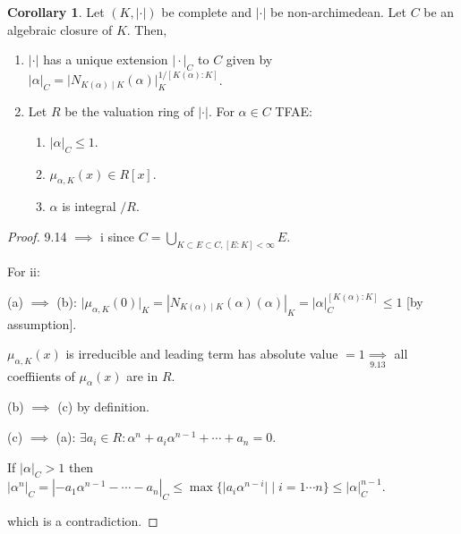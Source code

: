 \documentclass[openany]{amsbook}
\numberwithin{section}{chapter}
\theoremstyle{definition}
\newtheorem{corollary}[theorem]{Corollary}
\begin{document}
\begin{corollary}
    Let \((K,\vert \cdot \vert)\) be complete and \(\vert \cdot \vert\) be non-archimedean. Let \(C\) be an algebraic closure of \(K\). Then,

    \begin{enumerate}[label=\roman*)]
        \item \(\vert \cdot \vert\) has a unique extension \(\vert \cdot \vert _C\) to \(C\) given by \(\vert \alpha \vert _C = \vert N_{K(\alpha)\mid K}(\alpha) \vert_K^{1 / [K(\alpha):K]}\).
        \item Let \(R\) be the valuation ring of \(\vert \cdot \vert\). For \(\alpha \in C\) TFAE:
        \begin{enumerate}[label=\alph*)]
            \item \(\vert \alpha  \vert _C \leq 1\).
            \item \(\mu_{\alpha, K}(x) \in R[x]\).
            \item \(\alpha\) is integral \(/ R\). 
        \end{enumerate} 
    \end{enumerate} 
\end{corollary}

\begin{proof}
    9.14 \(\implies\) i since \(C = \bigcup_{K \subset E \subset C, [E:K] < \infty} E \).
    
    For ii:

    (a) \(\implies\) (b): \(\vert \mu_{\alpha , K}(0) \vert _K = \left\vert N_{K(\alpha)\mid K}(\alpha)(\alpha) \right\vert _K = \vert \alpha \vert _C^{[K(\alpha):K]} \leq 1\) [by assumption].

    \(\mu_{\alpha ,K}(x)\) is irreducible and leading term has absolute value \(= 1 \underset{9.13}{\implies}\) all coeffiients of \(\mu_\alpha (x)\) are in \(R\).

    (b) \(\implies\) (c) by definition.

    (c) \(\implies\) (a): \(\exists a_i \in R : \alpha^n + a_i \alpha^{n-1} + \cdots + a_n = 0\).

    If \(\vert \alpha \vert _C > 1\) then \(\vert \alpha^n \vert _C = \left\vert - a_1 \alpha^{n-1} - \cdots - a_n \right\vert _C \leq \max \{ \vert a_i \alpha^{n-i}\vert \mid i = 1 \cdots n \} \leq \vert \alpha \vert _C ^{n-1} \).
    
    which is a contradiction.
\end{proof}
\end{document}
